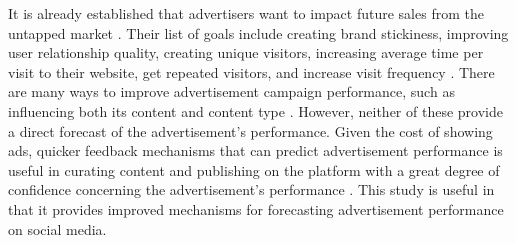 \documentclass{article}
\begin{document}
It is already established that advertisers want to impact future sales from the untapped market \cite{Guo2020}. Their list of goals include creating brand stickiness, improving user relationship quality, creating unique visitors, increasing average time per visit to their website, get repeated visitors, and increase visit frequency \cite{Bhat2002}. There are many ways to improve advertisement campaign performance, such as influencing both its content \cite{MissingCitation} and content type \cite{MissingCitation}. However, neither of these provide a direct forecast of the advertisement's performance. Given the cost of showing ads, quicker feedback mechanisms that can predict advertisement performance is useful in curating content and publishing on the platform with a great degree of confidence concerning the advertisement's performance \cite{MissingCitation}. This study is useful in that it provides improved mechanisms for forecasting advertisement performance on social media.





\end{document}
